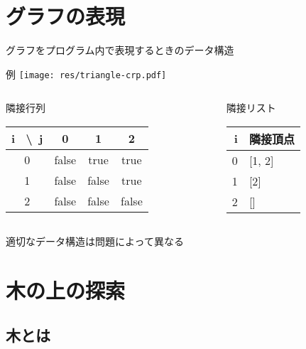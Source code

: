 \documentclass[dvipdfmx]{beamer}
\begin{document}
\section{グラフの表現}

\begin{frame}{\insertsection}
  グラフをプログラム内で表現するときのデータ構造
  \begin{block}{例}
    \centering
    \texttt{[image: res/triangle-crp.pdf]}
  \end{block}
  \begin{columns}[t]
    \begin{column}{0.48\textwidth}
      \begin{block}{隣接行列}
        \begin{table}
          \begin{tabular}{c|ccc}
            i \ \textbackslash \ j & 0 & 1 & 2 \\ \hline
            0 & false & true & true \\
            1 & false & false & true \\
            2 & false & false & false
          \end{tabular}
        \end{table}
      \end{block}
    \end{column}
    \begin{column}{0.48\textwidth}
      \begin{block}{隣接リスト}
        \begin{table}
          \begin{tabular}{r|l}
            i & 隣接頂点 \\ \hline
            0 & [1, 2] \\
            1 & [2] \\
            2 & []
          \end{tabular}
        \end{table}
      \end{block}
    \end{column}
  \end{columns}
  適切なデータ構造は問題によって異なる
\end{frame}

\section{木の上の探索}

\subsection{木とは}
\end{document}
